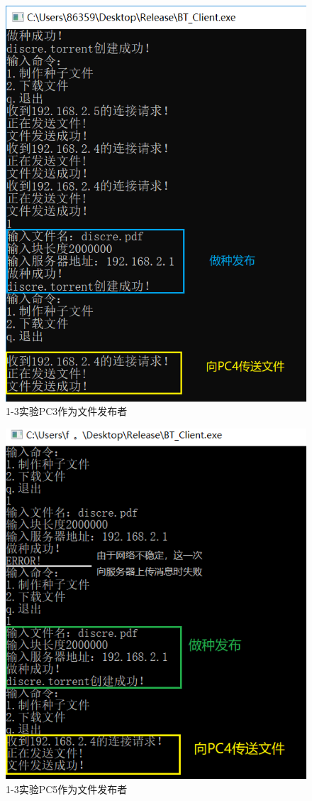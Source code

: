 \documentclass[thesis]{thesis}
\begin{document}
	\begin{minipage}{0.5\linewidth}
	\begin{figure}[H]
		\centering
		\includegraphics[width=0.9\linewidth]{fig/PC3_31.png}
		\caption{1-3实验\quad PC3作为文件发布者}
		\label{res:PC3_31}
	\end{figure}
	\end{minipage}
	\begin{figure}[H]
		\centering
		\includegraphics[width=0.4\linewidth]{fig/PC5_31.png}
		\caption{1-3实验\quad PC5作为文件发布者}
		\label{res:PC5_31}
	\end{figure}
	
\end{document}

